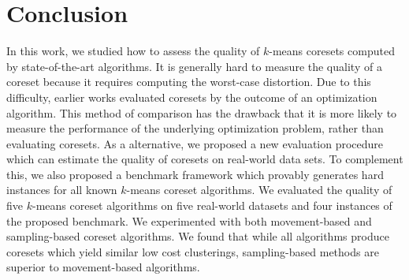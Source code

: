 \section{Conclusion} \label{sec:conclusion}
In this work, we studied how to assess the quality of $k$-means coresets computed by state-of-the-art algorithms. It is generally hard to measure the quality of a coreset because it requires computing the worst-case distortion. Due to this difficulty, earlier works evaluated coresets by the outcome of an optimization algorithm. This method of comparison has the drawback that it is more likely to measure the performance of the underlying optimization problem, rather than evaluating coresets. As a alternative, we proposed a new evaluation procedure which can estimate the quality of coresets on real-world data sets. To complement this, we also proposed a benchmark framework which provably generates hard instances for all known $k$-means coreset algorithms. We evaluated the quality of five $k$-means coreset algorithms on five real-world datasets and four instances of the proposed benchmark. We experimented with both movement-based and sampling-based coreset algorithms. We found that while all algorithms produce coresets which yield similar low cost clusterings, sampling-based methods are superior to movement-based algorithms. 
